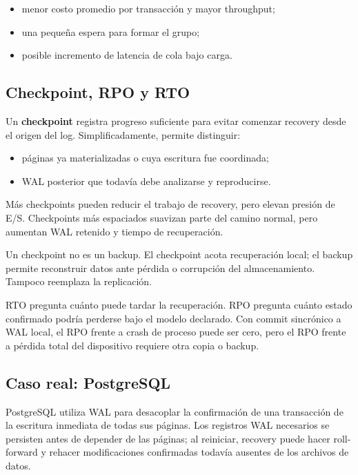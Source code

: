 \documentclass[variant=apuntes,cover=institutional,mode=screen]{ua-engineering-v6-article}
\begin{document}
\begin{itemize}
\item menor costo promedio por transacción y mayor throughput;
\item una pequeña espera para formar el grupo;
\item posible incremento de latencia de cola bajo carga.
\end{itemize}

\subsection{Checkpoint, RPO y RTO}

Un \textbf{checkpoint} registra progreso suficiente para evitar comenzar recovery desde el origen del log. Simplificadamente, permite distinguir:

\begin{itemize}
\item páginas ya materializadas o cuya escritura fue coordinada;
\item WAL posterior que todavía debe analizarse y reproducirse.
\end{itemize}

Más checkpoints pueden reducir el trabajo de recovery, pero elevan presión de E/S. Checkpoints más espaciados suavizan parte del camino normal, pero aumentan WAL retenido y tiempo de recuperación.

\begin{uawarn}
Un checkpoint no es un backup. El checkpoint acota recuperación local; el backup permite reconstruir datos ante pérdida o corrupción del almacenamiento. Tampoco reemplaza la replicación.
\end{uawarn}

RTO pregunta cuánto puede tardar la recuperación. RPO pregunta cuánto estado confirmado podría perderse bajo el modelo declarado. Con commit sincrónico a WAL local, el RPO frente a crash de proceso puede ser cero, pero el RPO frente a pérdida total del dispositivo requiere otra copia o backup.

\subsection{Caso real: PostgreSQL}

PostgreSQL utiliza WAL para desacoplar la confirmación de una transacción de la escritura inmediata de todas sus páginas. Los registros WAL necesarios se persisten antes de depender de las páginas; al reiniciar, recovery puede hacer roll-forward y rehacer modificaciones confirmadas todavía ausentes de los archivos de datos.
\end{document}
